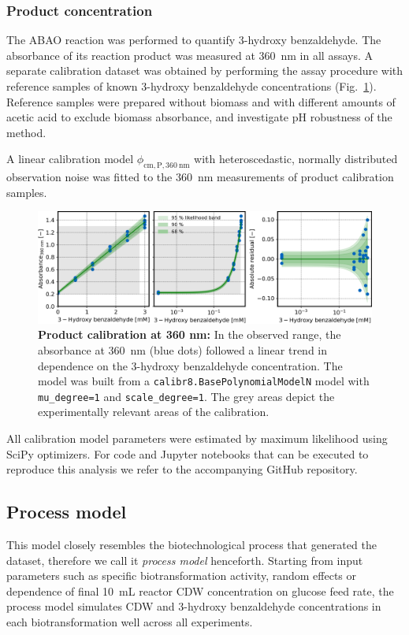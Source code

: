 \documentclass[sn-standardnature]{sn-jnl}%
\theoremstyle{thmstyleone}%
\theoremstyle{thmstyletwo}%
\theoremstyle{thmstylethree}%
\begin{document}
\subsubsection{Product concentration}
The ABAO reaction was performed to quantify 3-hydroxy benzaldehyde.
The absorbance of its reaction product was measured at 360~nm in all assays.
A separate calibration dataset was obtained by performing the assay procedure with reference samples of known 3-hydroxy benzaldehyde concentrations (Fig.~\ref{fig_cmPA360}).
Reference samples were prepared without biomass and with different amounts of acetic acid to exclude biomass absorbance, and investigate pH robustness of the method.

A linear calibration model $\phi_\mathrm{cm,P,360\ nm}$ with heteroscedastic, normally distributed observation noise was fitted to the 360~nm measurements of product calibration samples.

\begin{figure}[H]
    \centering
    \includegraphics[width=1.0\textwidth]{figures/cm_product_A360.png}
    \caption{
        \textbf{Product calibration at 360 nm:}
        In the observed range, the absorbance at 360~nm (blue dots) followed a linear trend in dependence on the 3-hydroxy benzaldehyde concentration.
        The model was built from a \texttt{calibr8.BasePolynomialModelN} model with \texttt{mu\_degree=1} and \texttt{scale\_degree=1}. 
        The grey areas depict the experimentally relevant areas of the calibration.
    }
    \label{fig_cmPA360}
\end{figure}

All calibration model parameters were estimated by maximum likelihood using SciPy optimizers.
For code and Jupyter notebooks that can be executed to reproduce this analysis we refer to the accompanying GitHub repository.


\subsection{Process model}
This model closely resembles the biotechnological process that generated the dataset, therefore we call it \textit{process model} henceforth.
Starting from input parameters such as specific biotransformation activity, random effects or dependence of final 10~mL reactor CDW concentration on glucose feed rate, the process model simulates CDW and 3-hydroxy benzaldehyde concentrations in each biotransformation well across all experiments.
\end{document}
